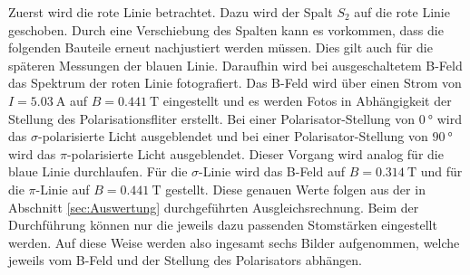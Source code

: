 Zuerst wird die rote Linie betrachtet. Dazu wird der Spalt $S_2$ auf die rote Linie geschoben. Durch eine Verschiebung des Spalten kann es vorkommen, dass die folgenden Bauteile erneut nachjustiert werden müssen. Dies gilt auch für die späteren Messungen der blauen Linie.
Daraufhin wird bei ausgeschaltetem B-Feld das Spektrum der roten Linie fotografiert. Das B-Feld wird über einen Strom von $I=\SI{5.03}{\ampere}$ auf $B=\SI{0.441}{\tesla}$ eingestellt und es werden Fotos in Abhängigkeit der Stellung des Polarisationsfliter erstellt. Bei einer Polarisator-Stellung von $\SI{0}{\degree}$ wird das $\sigma$-polarisierte Licht ausgeblendet und bei einer Polarisator-Stellung von $\SI{90}{\degree}$ wird das $\pi$-polarisierte Licht ausgeblendet.
Dieser Vorgang wird analog für die blaue Linie durchlaufen. Für die $\sigma$-Linie wird das B-Feld auf $B=\SI{0.314}{\tesla}$ und für die $\pi$-Linie auf $B=\SI{0.441}{\tesla}$ gestellt. Diese genauen Werte folgen aus der in Abschnitt \ref{sec:Auswertung} durchgeführten Ausgleichsrechnung. Beim der Durchführung können nur die jeweils dazu passenden Stomstärken eingestellt werden. Auf diese Weise werden also ingesamt sechs Bilder aufgenommen, welche jeweils vom B-Feld und der Stellung des Polarisators abhängen.

